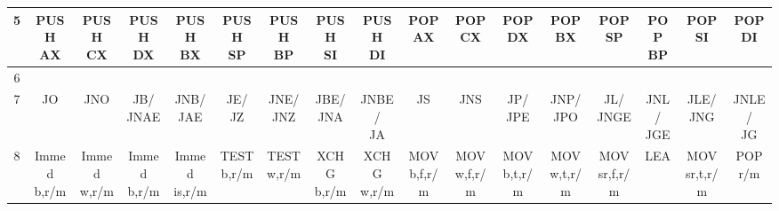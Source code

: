 {\begin{longtable}{|c|c|c|c|c|c|c|c|c|c|c|c|c|c|c|c|c|}
\hline
5 & \makecell{PUSH\\AX} & \makecell{PUSH\\CX} & \makecell{PUSH\\DX} & \makecell{PUSH\\BX} & \makecell{PUSH\\SP} & \makecell{PUSH\\BP} & \makecell{PUSH\\SI} & \makecell{PUSH\\DI} & \makecell{POP \\AX} & \makecell{POP \\CX} & \makecell{POP \\DX} & \makecell{POP \\BX} & \makecell{POP \\SP} & \makecell{POP \\BP} & \makecell{POP \\SI} & \makecell{POP \\DI} \\
\hline
6 &  &  &  &  &  &  &  &  &  &  &  &  &  &  &  &  \\
\hline
7 & JO & JNO & \makecell{JB/\\JNAE} & \makecell{JNB/\\JAE} & \makecell{JE/\\JZ} & \makecell{JNE/\\JNZ} & \makecell{JBE/\\JNA} & \makecell{JNBE/\\JA} & JS & JNS & \makecell{JP/\\JPE} & \makecell{JNP/\\JPO} & \makecell{JL/\\JNGE} & \makecell{JNL/\\JGE} & \makecell{JLE/\\JNG} & \makecell{JNLE/\\JG} \\
\hline
8 & \makecell{Immed\\b,r/m} & \makecell{Immed\\w,r/m} & \makecell{Immed\\b,r/m} & \makecell{Immed\\is,r/m} & \makecell{TEST\\b,r/m} & \makecell{TEST\\w,r/m} & \makecell{XCHG\\b,r/m} & \makecell{XCHG\\w,r/m} & \makecell{MOV\\b,f,r/m} & \makecell{MOV\\w,f,r/m} & \makecell{MOV\\b,t,r/m} & \makecell{MOV\\w,t,r/m} & \makecell{MOV\\sr,f,r/m} & LEA & \makecell{MOV\\sr,t,r/m} & \makecell{POP\\r/m} \\

\end{longtable}}

